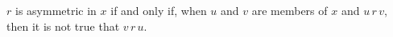 $r$ is asymmetric in $x$ if and only if, when $u$ and $v$ are members of $x$ and $u \, r \, v$, then it is not true that $v \, r \, u$.
